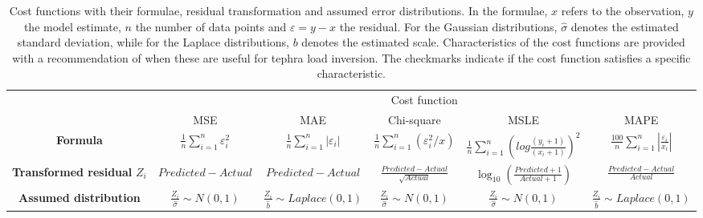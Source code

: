 \documentclass[a4paper,fleqn]{cas-sc}
\begin{document}
    \begin{table}[]
    \scriptsize
    \caption{Cost functions with their formulae, residual transformation and assumed error distributions. In the formulae, $x$ refers to the observation, $y$ the model estimate, $n$ the number of data points and $\varepsilon = y-x$ the residual. For the Gaussian distributions, $\hat{\sigma}$ denotes the estimated standard deviation, while for the Laplace distributions, $b$ denotes the estimated scale. Characteristics of the cost functions are provided with a recommendation of when these are useful for tephra load inversion. The checkmarks indicate if the cost function satisfies a specific characteristic.}
     \label{tab:costf}
    \begin{tabular}{@{}lcccccc@{}}
    \toprule
    \multicolumn{1}{c}{\multirow{2}{*}{}} 
    & \multirow{2}{*}{}                                                 
    & \multicolumn{5}{c}{Cost function}                                    \\ \cmidrule(l){3-7} 
    \multicolumn{2}{c}{}                                                                                                                        & MSE                                                                  & MAE                                                                  & Chi-square                                                           & MSLE                                                                 & MAPE                                                                 \\ \midrule
    \multicolumn{2}{c}{\textbf{Formula}}                                    & $\frac{1}{n} \sum_{i=1}^{n} \varepsilon_{i}^{2} $ & $\frac{1}{n} \sum_{i=1}^{n} \left |\varepsilon_{i} \right |$ & $\frac{1}{n} \sum_{i=1}^{n} (\varepsilon_{i}^2 / x)$ & $\frac{1}{n} \sum_{i=1}^{n} \left (log \frac{(y_{i}+1) }{(x_{i}+1)} \right )^2$ & $\frac{100}{n} \sum_{i=1}^{n} \left | \frac{\varepsilon_{i}}{x_{i}} \right |$ \\ \midrule
    \multicolumn{2}{c}{ \textbf{Transformed residual} $Z_{i}$}            & $Predicted - Actual$                                                 & $Predicted - Actual$                                                 & $\frac{Predicted - Actual}{\sqrt{Actual}}$                           & $\log_{10}\left(\frac{Predicted + 1}{Actual + 1}\right)$             & $\frac{Predicted - Actual}{Actual}$                                  \\ \midrule
    \multicolumn{2}{c}{\textbf{Assumed distribution}}                                                           & $\frac{Z_{i}}{\hat{\sigma}} \sim N(0, 1)$                                                    & $\frac{Z_{i}}{\hat{b}} \sim Laplace(0, 1)$                                                        & $\frac{Z_{i}}{\hat{\sigma}} \sim N(0, 1)$                                                      & $\frac{Z_{i}}{\hat{\sigma}} \sim N(0, 1)$                                                                   & $\frac{Z_{i}}{\hat{b}} \sim Laplace(0, 1)$                                                                          \\ \midrule

\end{tabular}
\end{table}
\end{document}
